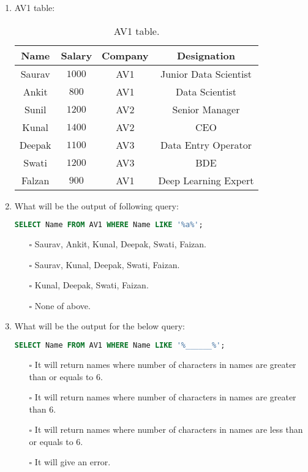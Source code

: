 \documentclass[10pt]{article}
\newcommand{\lightrule}{%
	\arrayrulecolor{black!30}%
	\midrule[\lightrulewidth]%
	\arrayrulecolor{black}}
\begin{document}
\begin{enumerate}
			\item AV1 table:	
				\begin{table}[H]
					\centering
					\begin{tabular}{@{} *{4}{c} @{}}
						\toprule
							\textbf{Name} & \textbf{Salary} & \textbf{Company} & \textbf{Designation} \\
						\midrule
							Saurav & $1000$ & AV1 & Junior Data Scientist \\ 
						\lightrule
							Ankit & $800$ & AV1 & Data Scientist \\ 
						\lightrule
							Sunil & $1200$ & AV2 & Senior Manager \\ 
						\lightrule
							Kunal & $1400$ & AV2 & CEO \\ 
						\lightrule
							Deepak & $1100$ & AV3 & Data Entry Operator \\ 
						\lightrule
							Swati & $1200$ & AV3 & BDE \\ 
						\lightrule
							Falzan & $900$ & AV1 & Deep Learning Expert \\ 
						\bottomrule
					\end{tabular}
					\caption{AV1 table.}
				\end{table}

			\item What will be the output of following query: 
				\begin{lstlisting}[language=SQL,firstline=1, lastline=1] 
					SELECT Name FROM AV1 WHERE Name LIKE '%a%';
				\end{lstlisting}

				\begin{enumerate}
					\item[$\square$]  Saurav, Ankit, Kunal, Deepak, Swati, Faizan.
					\item[$\square$] Saurav, Kunal, Deepak, Swati, Faizan.
					\item[$\square$]  Kunal, Deepak, Swati, Faizan.
					\item[$\square$]  None of above.
				\end{enumerate}

			\newpage
				
			\item What will be the output for the below query:
				\begin{lstlisting}[language=SQL,firstline=1, lastline=1] 
					SELECT Name FROM AV1 WHERE Name LIKE '%______%';
				\end{lstlisting}

				\begin{enumerate}
					\item[$\square$] It will return names where number of characters in names are greater than or equals to 6.
					\item[$\square$] It will return names where number of characters in names are greater than 6.
					\item[$\square$] It will return names where number of characters in names are less than or equals to 6.
					\item[$\square$] It will give an error.
				\end{enumerate}


\end{enumerate}
\end{document}
